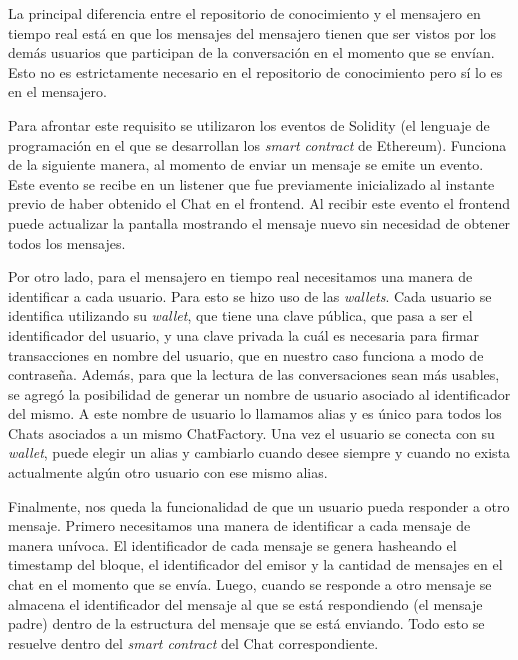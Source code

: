 La principal diferencia entre el repositorio de conocimiento y el mensajero en tiempo real está en que los mensajes del mensajero tienen que ser vistos por los demás usuarios que participan de la conversación en el momento que se envían. Esto no es estrictamente necesario en el repositorio de conocimiento pero sí lo es en el mensajero.

Para afrontar este requisito se utilizaron los eventos de Solidity (el lenguaje de programación en el que se desarrollan los \textit{smart contract} de Ethereum). Funciona de la siguiente manera, al momento de enviar un mensaje se emite un evento. Este evento se recibe en un listener que fue previamente inicializado al instante previo de haber obtenido el Chat en el frontend. Al recibir este evento el frontend puede actualizar la pantalla mostrando el mensaje nuevo sin necesidad de obtener todos los mensajes.


Por otro lado, para el mensajero en tiempo real necesitamos una manera de identificar a cada usuario. Para esto se hizo uso de las \textit{wallets}. Cada usuario se identifica utilizando su \textit{wallet}, que tiene una clave pública, que pasa a ser el identificador del usuario, y una clave privada la cuál es necesaria para firmar transacciones en nombre del usuario, que en nuestro caso funciona a modo de contraseña. Además, para que la lectura de las conversaciones sean más usables, se agregó la posibilidad de generar un nombre de usuario asociado al identificador del mismo. A este nombre de usuario lo llamamos alias y es único para todos los Chats asociados a un mismo ChatFactory. Una vez el usuario se conecta con su \textit{wallet}, puede elegir un alias y cambiarlo cuando desee siempre y cuando no exista actualmente algún otro usuario con ese mismo alias.

Finalmente, nos queda la funcionalidad de que un usuario pueda responder a otro mensaje. Primero necesitamos una manera de identificar a cada mensaje de manera unívoca. El identificador de cada mensaje se genera hasheando el timestamp del bloque, el identificador del emisor y la cantidad de mensajes en el chat en el momento que se envía. Luego, cuando se responde a otro mensaje se almacena el identificador del mensaje al que se está respondiendo (el mensaje padre) dentro de la estructura del mensaje que se está enviando. Todo esto se resuelve dentro del \textit{smart contract} del Chat correspondiente.
